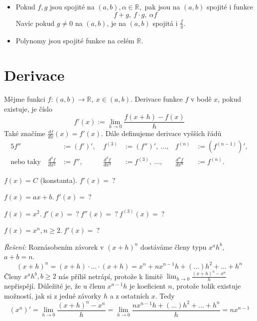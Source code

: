 \begin{důsledek}
\leavevmode
\begin{itemize}
	\item Pokud $f,g$ jsou spojité na $(a,b), \alpha\in \mathbb{R},$ pak jsou na $(a,b)$ spojité i funkce
		\begin{equation*}
		  f+g,\ f\cdot g,\ \alpha f
		\end{equation*}
	Navíc pokud $g\neq 0$ na $(a,b)$, je na $(a,b)$ spojitá i $\frac{f}{g}.$
	\item Polynomy jsou spojité funkce na celém $\mathbb{R}$.
\end{itemize}
\end{důsledek}

\section{Derivace}
\begin{definice}
  Mějme funkci $f\colon (a,b)\to \mathbb{R},\ x\in (a,b).$ Derivace funkce $f$ v bodě $x$, pokud existuje, je číslo
  \begin{equation*}
	  f'(x) := \lim_{h\to 0}\frac{f(x+h)-f(x)}{h}
  \end{equation*}
Také značíme $\frac{df}{dx}(x)=f'(x).$ Dále definujeme derivace vyšších řádů
\begin{alignat*}{5}
	f''&:=(f')',\ &f^{(3)}&:=(f'')',\ \hdots, &f^{(n)}&:=(f^{(n-1)})', \\
	\text{nebo taky}\quad \frac{d^{2}f}{dx^{2}}&:=f'',\ &\frac{d^{3}f}{dx^{3}}&:=f^{(3)},\ \hdots, &\frac{d^{n}f}{dx^{n}}&:=f^{(n)}.
  \end{alignat*}
\end{definice}

\begin{úloha}
  $f(x)=C$ (konstanta). $f'(x)=\ ?$
\end{úloha}
\begin{úloha}
  $f(x)=ax+b.\ f'(x)=\ ?$ 
\end{úloha}
\begin{úloha}
  $f(x)=x^{2}.\ f'(x)=\ ?\ f''(x)=\ ?\ f^{(3)}(x)=\ ?\ $
\end{úloha}

\begin{příklad}
  $f(x)=x^{n}, n\geq 2.\ f'(x)=\ ?$\par
\textit{Řešení:} Roznásobením závorek v $(x+h)^{n}$ dostáváme členy typu $x^{a}h^{b},$ $a+b=n.$
\begin{equation*}
	(x+h)^{n} = (x+h)\cdot \hdots \cdot (x+h) = x^{n}+nx^{n-1}h + (\hdots)h^{2}+\hdots + h^{n}
\end{equation*}
Členy $x^{a}h^{b}, b\geq 2$ nás příliš netrápí, protože k limitě $\lim_{h\to 0}\frac{(x+h)^{n}-x^{n}}{h}$ nepřispějí. Důležité je, že u členu $x^{n-1}h$ je koeficient $n$, protože tolik existuje možností, jak si z jedné závorky  $h$ a z ostatních $x$. Tedy
\begin{equation*}
	(x^{n})'=\lim_{h\to 0}\frac{(x+h)^{n}-x^{n}}{h}=\lim_{h\to 0}\frac{nx^{n-1}h+(\hdots)h^{2}+\hdots+h^{n}}{h}=nx^{n-1}
\end{equation*}
\end{příklad}

